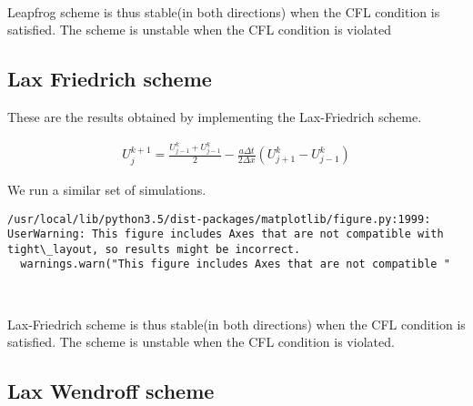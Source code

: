 \documentclass[11pt]{article}
\begin{document}
    \begin{center}
    \end{center}
    { \hspace*{\fill} \\}
    
    Leapfrog scheme is thus stable(in both directions) when the CFL
condition is satisfied. The scheme is unstable when the CFL condition is
violated

    \subsection{Lax Friedrich scheme}\label{lax-friedrich-scheme}

These are the results obtained by implementing the Lax-Friedrich scheme.

\begin{align}
U_j^{k+1} = \frac{U_{j-1}^{k} + U_{j-1}^{k}}{2} - \frac{a \Delta t}{2\Delta x}\left( U_{j+1}^k - U_{j-1}^k\right)
\end{align}

We run a similar set of simulations.

    \begin{Verbatim}[commandchars=\\\{\}]
/usr/local/lib/python3.5/dist-packages/matplotlib/figure.py:1999: UserWarning: This figure includes Axes that are not compatible with tight\_layout, so results might be incorrect.
  warnings.warn("This figure includes Axes that are not compatible "

    \end{Verbatim}

    \begin{center}
    \end{center}
    { \hspace*{\fill} \\}
    
    Lax-Friedrich scheme is thus stable(in both directions) when the CFL
condition is satisfied. The scheme is unstable when the CFL condition is
violated.

    \subsection{Lax Wendroff scheme}\label{lax-wendroff-scheme}
\end{document}
